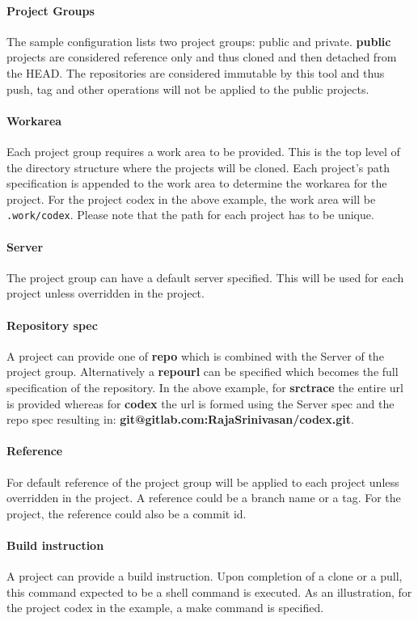 \documentclass[11pt, a4paper]{article} %
\begin{document}
\paragraph{Project Groups} The sample configuration lists two project groups: public and private. \textbf{public} projects are considered reference only and thus cloned and then detached from the HEAD. The repositories are considered immutable by this tool and thus push, tag and other operations will not be applied to the public projects.

\paragraph{Workarea} Each project group requires a work area to be provided. This is the top level of the directory structure where the projects will be cloned. Each project's path specification is appended to the work area to determine the workarea for the project. For the project codex in the above example, the work area will be \texttt{.work/codex}. Please note that the path for each project has to be unique.

\paragraph{Server} The project group can have a default server specified. This will be used for each project unless overridden in the project. 

\paragraph{Repository spec} A project can provide one of \textbf{repo} which is combined with the Server of the project group. Alternatively a \textbf{repourl} can be specified which becomes the full specification of the repository. In the above example, for \textbf{srctrace} the entire url is provided whereas for \textbf{codex} the url is formed using the Server spec and the repo spec resulting in: \textbf{git@gitlab.com:RajaSrinivasan/codex.git}.

\paragraph{Reference} For default reference of the project group will be applied to each project unless overridden in the project. A reference could be a branch name or a tag. For the project, the reference could also be a commit id.

\paragraph{Build instruction} A project can provide a build instruction. Upon completion of a clone or a pull, this command expected to be a shell command is executed. As an illustration, for the project codex in the example, a make command is specified.
\end{document}
